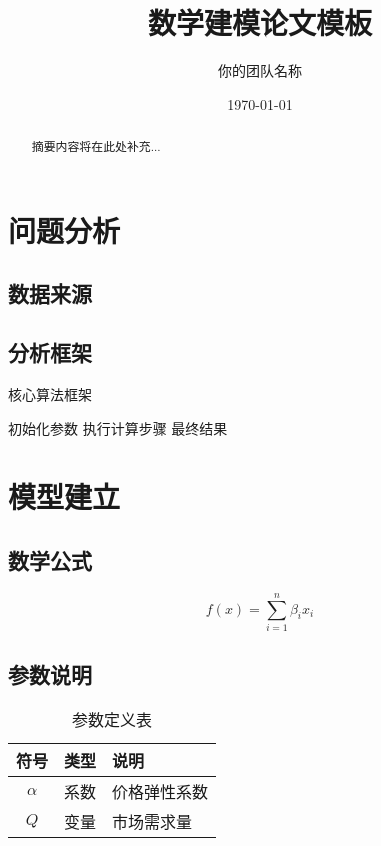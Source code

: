 \documentclass[12pt,a4paper]{article}
\title{数学建模论文模板}
\author{你的团队名称}
\date{\today}
\begin{document}
\maketitle

\begin{abstract}
摘要内容将在此处补充...
\end{abstract}

\section{问题分析}
\subsection{数据来源}

\subsection{分析框架}
\begin{algorithm}[H]
\caption{核心算法框架} 
\begin{algorithmic}[1]
\State 初始化参数
    \State 执行计算步骤
\EndFor
\State \Return 最终结果
\end{algorithmic}
\end{algorithm}


\section{模型建立}
\subsection{数学公式}
\begin{equation}
f(x) = \sum_{i=1}^n \beta_i x_i
\end{equation}

\subsection{参数说明}
\begin{table}[h]
\centering
\caption{参数定义表}
\begin{tabular}{cll}
\toprule
符号 & 类型 & 说明 \\
\midrule
$\alpha$ & 系数 & 价格弹性系数 \\
$Q$ & 变量 & 市场需求量 \\
\bottomrule
\end{tabular}
\end{table}
\end{document}
